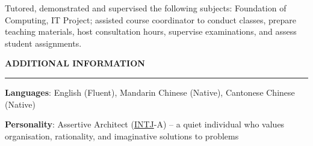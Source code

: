 \documentclass{cv}
\begin{document}
\begin{list}{}{\setlength{\leftmargin}{0pt}}
    \begin{list}{\raisebox{2.0pt}{\tiny$\bullet$}\space}{\setlength{\leftmargin}{11.2pt}}
        \itemsep -5.0pt \vspace{-4.0pt}
        \item Tutored, demonstrated and supervised the following subjects: Foundation of Computing, IT Project; assisted course coordinator to conduct classes, prepare teaching materials, host consultation hours, supervise examinations, and assess student assignments.
    \end{list}
\end{list}


\sectionskip


\textbf{\uppercase{Additional Information}}
\sectionlineskip
\hrule height 0.6pt
\begin{list}{}{\setlength{\leftmargin}{0pt}}
\itemsep -3.0pt
\item
    \textbf{Languages}: English (Fluent), Mandarin Chinese (Native), Cantonese Chinese (Native)
\item
    \textbf{Personality}: Assertive Architect (\href{https://www.16personalities.com/intj-personality}{INTJ}-A) -- a quiet individual who values organisation, rationality, and imaginative solutions to problems
\end{list}

\end{document}
